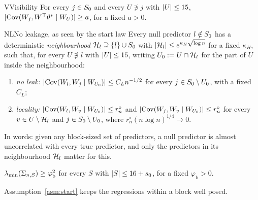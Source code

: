 
\begin{assumption}{V}{Visibility}
For every $j\in S_0$ and every $U\not\ni j$ with $\lvert U\rvert\le15$, $\lvert \operatorname{Cov}(W_j,W^\top\theta^*\mid W_U)\rvert\ge a$, for a fixed
$a>0$.
\end{assumption}

\begin{assumption}{NL}{No leakage, as seen by the start law}
Every null predictor $l\notin S_0$ has a deterministic \emph{neighbourhood} $\mathcal H_l\supseteq\{l\}\cup S_0$ with
$\lvert \mathcal H_l\rvert\le e^{\kappa_H\sqrt{\log n}}$ for a fixed $\kappa_H$, such that, for every $U\not\ni l$ with $\lvert U\rvert\le15$, writing
$U_0:=U\cap\mathcal H_l$ for the part of $U$ inside the neighbourhood:
\begin{enumerate}[label=(\roman*),leftmargin=2em,itemsep=1pt]
  \item \emph{no leak:} $\lvert \operatorname{Cov}(W_l,W_j\mid W_{U_0})\rvert\le C_Ln^{-1/2}$ for every $j\in S_0\setminus U_0$, with a fixed $C_L$;
  \item \emph{locality:} $\lvert \operatorname{Cov}(W_l,W_v\mid W_{U_0})\rvert\le r^\circ_n$ and $\lvert \operatorname{Cov}(W_j,W_v\mid W_{U_0})\rvert\le r^\circ_n$ for every
    $v\in U\setminus\mathcal H_l$ and $j\in S_0\setminus U_0$, where $r^\circ_n(n\log n)^{1/4}\to0$.
\end{enumerate}
\end{assumption}

In words: given any block-sized set of predictors, a null predictor is almost uncorrelated with every true predictor, and
only the predictors in its neighbourhood $\mathcal H_l$ matter for this.

\begin{localassumption}\label{asm:start}
$\lambda_{\min}(\Sigma_{n,S})\ge\varphi_{\mathrm b}^2$ for every $S$ with $\lvert S\rvert\le16+s_0$, for a fixed $\varphi_{\mathrm b}>0$.
\end{localassumption}

Assumption~\ref{asm:start} keeps the regressions within a block well posed.

